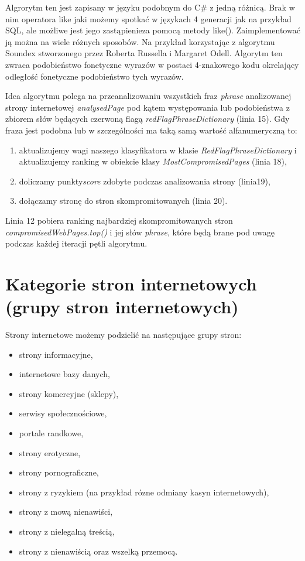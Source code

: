 \documentclass[9pt,a4paper]{extarticle}
\begin{document}
\begin{multicols}{2}
Algrorytm ten jest zapisany w języku podobnym do C\# z jedną różnicą. Brak w nim operatora like jaki możemy spotkać w językach 4 generacji jak na przykład SQL, ale możliwe jest jego zastąpienieza pomocą metody like(). Zaimplementować ją można na wiele różnych sposobów. Na przykład korzystając z algorytmu Soundex stworzonego przez Roberta Russella i Margaret Odell\cite{donald_e._knuth_art_2002}. Algorytm ten zwraca podobieństwo fonetyczne wyrazów w postaci 4-znakowego kodu okrelający odległość fonetyczne podobieństwo tych wyrazów.

Idea algorytmu polega na przeanalizowaniu wszystkich fraz \textit{phrase} analizowanej strony internetowej \textit{analysedPage} pod kątem występowania lub podobieństwa z zbiorem słów będących czerwoną flagą \textit{redFlagPhraseDictionary} (linia 15). Gdy fraza jest podobna lub w szczególności ma taką samą wartość alfanumeryczną to:
\begin{enumerate}
\item aktualizujemy wagi naszego klasyfikatora w klasie \textit{RedFlagPhraseDictionary} i aktualizujemy ranking w obiekcie klasy \textit{MostCompromisedPages} (linia 18),
\item doliczamy punkty\textit{score} zdobyte podczas analizowania strony (linia19),
\item dołączamy stronę do stron skompromitowanych (linia 20).
\end{enumerate}
Linia 12 pobiera ranking najbardziej skompromitowanych stron \textit{compromisedWebPages.top()} i jej słów \textit{phrase}, które będą brane pod uwagę podczas każdej iteracji pętli algorytmu.

\section{Kategorie stron internetowych (grupy stron internetowych)}
Strony internetowe możemy podzielić na następujące grupy stron:
\begin{itemize}
\item strony informacyjne,
\item	internetowe bazy danych,
\item	strony komercyjne (sklepy),
\item	serwisy społecznościowe,
\item	portale randkowe,
\item	strony erotyczne,
\item	strony pornograficzne,
\item	strony z ryzykiem (na przykład rózne odmiany kasyn internetowych),
\item	strony z mową nienawiści,
\item	strony z nielegalną treścią,
\item	strony z nienawiścią oraz wszelką przemocą.
\end{itemize}


\end{multicols}
\end{document}
